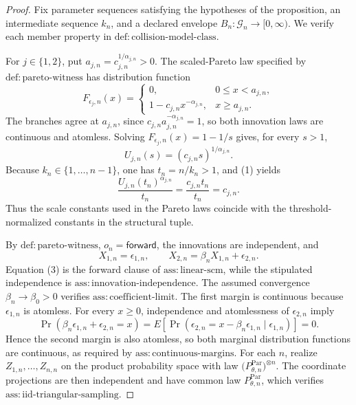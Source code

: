 \documentclass{article}
\begin{document}
\begin{proof}
Fix parameter sequences satisfying the hypotheses of the proposition, an intermediate sequence \(k_n\), and a declared envelope \(B_n:\mathcal G_n\to[0,\infty)\).  We verify each member property in \(\mathrm{def:collision\text{-}model\text{-}class}\).

For \(j\in\{1,2\}\), put \(a_{j,n}=c_{j,n}^{1/\alpha_{j,n}}>0\).  The scaled-Pareto law specified by \(\mathrm{def:pareto\text{-}witness}\) has distribution function
\[
 F_{\epsilon_j,n}(x)=
 \begin{cases}
 0,&0\leq x<a_{j,n},\\
 1-c_{j,n}x^{-\alpha_{j,n}},&x\geq a_{j,n}.
 \end{cases}
\]
The branches agree at \(a_{j,n}\), since \(c_{j,n}a_{j,n}^{-\alpha_{j,n}}=1\), so both innovation laws are continuous and atomless.  Solving \(F_{\epsilon_j,n}(x)=1-1/s\) gives, for every \(s>1\),
\[
 U_{j,n}(s)=(c_{j,n}s)^{1/\alpha_{j,n}}. \tag{1}
\]
Because \(k_n\in\{1,\ldots,n-1\}\), one has \(t_n=n/k_n>1\), and (1) yields
\[
 \frac{U_{j,n}(t_n)^{\alpha_{j,n}}}{t_n}
 =\frac{c_{j,n}t_n}{t_n}=c_{j,n}. \tag{2}
\]
Thus the scale constants used in the Pareto laws coincide with the threshold-normalized constants in the structural tuple.

By \(\mathrm{def:pareto\text{-}witness}\), \(o_n=\mathsf{forward}\), the innovations are independent, and
\[
 X_{1,n}=\epsilon_{1,n},\qquad
 X_{2,n}=\beta_nX_{1,n}+\epsilon_{2,n}. \tag{3}
\]
Equation (3) is the forward clause of \(\mathrm{ass:linear\text{-}scm}\), while the stipulated independence is \(\mathrm{ass:innovation\text{-}independence}\).  The assumed convergence \(\beta_n\to\beta_0>0\) verifies \(\mathrm{ass:coefficient\text{-}limit}\).  The first margin is continuous because \(\epsilon_{1,n}\) is atomless.  For every \(x\geq0\), independence and atomlessness of \(\epsilon_{2,n}\) imply
\[
 \Pr\!\left(\beta_n\epsilon_{1,n}+\epsilon_{2,n}=x\right)
 =E\!\left[
   \Pr\!\left(\epsilon_{2,n}=x-\beta_n\epsilon_{1,n}
      \mid\epsilon_{1,n}\right)
 \right]=0. \tag{4}
\]
Hence the second margin is also atomless, so both marginal distribution functions are continuous, as required by \(\mathrm{ass:continuous\text{-}margins}\).  For each \(n\), realize \(Z_{1,n},\ldots,Z_{n,n}\) on the product probability space with law \(\bigl(P_{\theta,n}^{\mathrm{Par}}\bigr)^{\otimes n}\).  The coordinate projections are then independent and have common law \(P_{\theta,n}^{\mathrm{Par}}\), which verifies \(\mathrm{ass:iid\text{-}triangular\text{-}sampling}\).


\end{proof}
\end{document}
